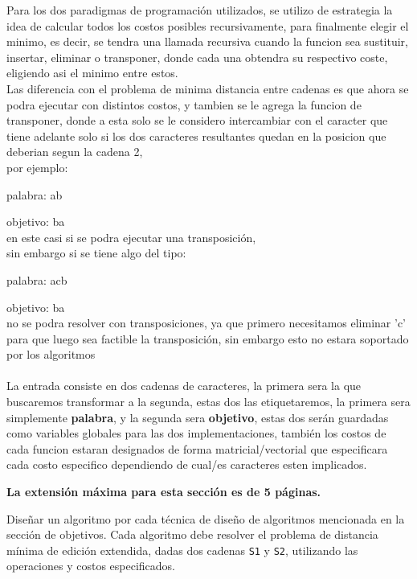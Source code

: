 Para los dos paradigmas de programación utilizados, se utilizo de estrategia la idea de calcular todos los costos posibles recursivamente, para finalmente elegir el minimo, es decir, se tendra una llamada recursiva cuando la funcion sea sustituir, insertar, eliminar o transponer, donde cada una obtendra su respectivo coste, eligiendo asi el minimo entre estos.\\
Las diferencia con el problema de minima distancia entre cadenas es que ahora se podra ejecutar con distintos costos, y tambien se le agrega la funcion de transponer, donde a esta solo se le considero intercambiar con el caracter que tiene adelante solo si los dos caracteres resultantes quedan en la posicion que deberian segun la cadena 2, \\por ejemplo:

palabra: ab

objetivo: ba\\ 
en este casi si se podra ejecutar una transposición, \\sin embargo si se tiene algo del tipo:

palabra: acb

objetivo: ba\\ 
no se podra resolver con transposiciones, ya que primero necesitamos eliminar 'c' para que luego sea factible la transposición, sin embargo esto no estara soportado por los algoritmos
\\ \\
La entrada consiste en dos cadenas de caracteres, la primera sera la que buscaremos transformar a la segunda, estas dos las etiquetaremos, la primera sera simplemente \textbf{palabra}, y la segunda sera \textbf{objetivo}, estas dos serán guardadas como variables globales para las dos implementaciones, también los costos de cada funcion estaran designados de forma matricial/vectorial que especificara cada costo especifico dependiendo de cual/es caracteres esten implicados.

\begin{mdframed}
    \textbf{La extensión máxima para esta sección es de 5 páginas.}
\end{mdframed}

Diseñar un algoritmo por cada técnica de diseño de algoritmos mencionada en la sección de objetivos. Cada algoritmo debe resolver el problema de distancia mínima de edición extendida, dadas dos cadenas \texttt{S1} y \texttt{S2}, utilizando las operaciones y costos especificados.

